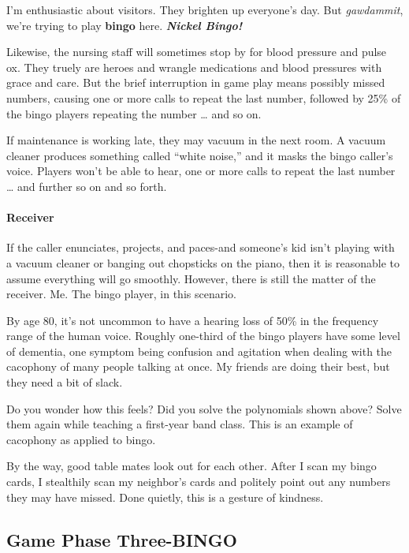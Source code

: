 \documentclass[
  letterpaper,
  DIV=11,
  numbers=noendperiod]{scrartcl}
\let\oldparagraph\paragraph
\renewcommand{\paragraph}[1]{\oldparagraph{#1}\mbox{}}
\begin{document}
I'm enthusiastic about visitors. They brighten up everyone's day. But
\emph{gawdammit}, we're trying to play \textbf{bingo} here.
\textbf{\emph{Nickel Bingo!}}

Likewise, the nursing staff will sometimes stop by for blood pressure
and pulse ox. They truely are heroes and wrangle medications and blood
pressures with grace and care. But the brief interruption in game play
means possibly missed numbers, causing one or more calls to repeat the
last number, followed by 25\% of the bingo players repeating the number
\ldots{} and so on.

If maintenance is working late, they may vacuum in the next room. A
vacuum cleaner produces something called ``white noise,'' and it masks
the bingo caller's voice. Players won't be able to hear, one or more
calls to repeat the last number \ldots{} and further so on and so forth.

\hypertarget{receiver}{%
\paragraph{Receiver}\label{receiver}}

If the caller enunciates, projects, and paces-and someone's kid isn't
playing with a vacuum cleaner or banging out chopsticks on the piano,
then it is reasonable to assume everything will go smoothly. However,
there is still the matter of the receiver. Me. The bingo player, in this
scenario.

By age 80, it's not uncommon to have a hearing loss of 50\% in the
frequency range of the human voice. Roughly one-third of the bingo
players have some level of dementia, one symptom being confusion and
agitation when dealing with the cacophony of many people talking at
once. My friends are doing their best, but they need a bit of slack.

Do you wonder how this feels? Did you solve the polynomials shown above?
Solve them again while teaching a first-year band class. This is an
example of cacophony as applied to bingo.

By the way, good table mates look out for each other. After I scan my
bingo cards, I stealthily scan my neighbor's cards and politely point
out any numbers they may have missed. Done quietly, this is a gesture of
kindness.

\hypertarget{game-phase-three-bingo}{%
\subsection{Game Phase Three-BINGO}\label{game-phase-three-bingo}}
\end{document}
